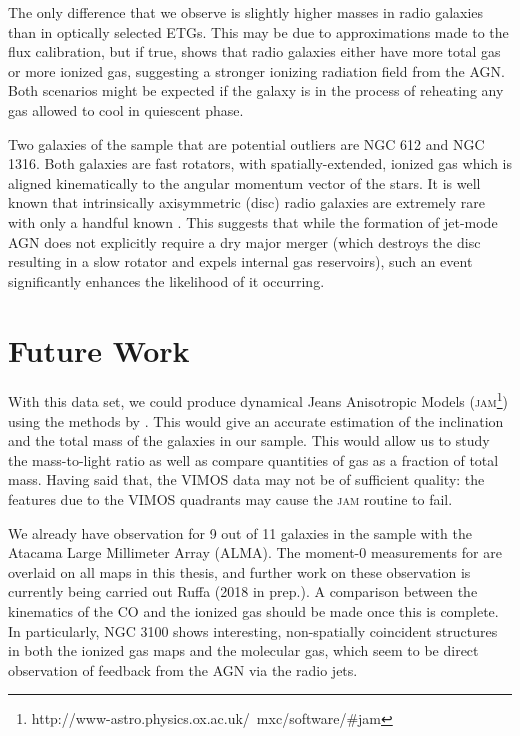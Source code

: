 The only difference that we observe is slightly higher  masses in radio galaxies than in optically selected ETGs. This may be due to approximations made to the flux calibration, but if true, shows that radio galaxies either have more total gas or more ionized gas, suggesting a stronger ionizing radiation field from the AGN. Both scenarios might be expected if the galaxy is in the process of reheating any gas allowed to cool in quiescent phase. 

Two galaxies of the sample that are potential outliers are NGC 612 and NGC 1316. Both galaxies are fast rotators, with spatially-extended, ionized gas which is aligned kinematically to the angular momentum vector of the stars. It is well known that intrinsically axisymmetric (disc) radio galaxies are extremely rare with only a handful known \citep[e.g.][]{Heckman1982, Ledlow1998, Hota2011a, Morganti2011, Mao2015}. This suggests that while the formation of jet-mode AGN does not explicitly require a dry major merger (which destroys the disc resulting in a slow rotator and expels internal gas reservoirs), such an event significantly enhances the likelihood of it occurring. 

\section{Future Work}
	\label{sec:future}
	With this data set, we could produce dynamical Jeans Anisotropic Models (\textsc{jam}\footnote{http://www-astro.physics.ox.ac.uk/~mxc/software/\#jam}) using the methods by \citet{Cappellari2008}. This would give an accurate estimation of the inclination and the total mass of the galaxies in our sample. This would allow us to study the mass-to-light ratio as well as compare quantities of gas as a fraction of total mass. Having said that, the VIMOS data may not be of sufficient quality: the features due to the VIMOS quadrants may cause the \textsc{jam} routine to fail. 

	We already have observation for 9 out of 11 galaxies in the sample with the Atacama Large Millimeter Array (ALMA). The moment-0 measurements for  are overlaid on all maps in this thesis, and further work on these observation is currently being carried out Ruffa (2018 in prep.). A comparison between the kinematics of the CO and the ionized gas should be made once this is complete. In particularly, NGC 3100 shows interesting, non-spatially coincident structures in both the ionized gas maps and the molecular gas, which seem to be direct observation of feedback from the AGN via the radio jets. 


